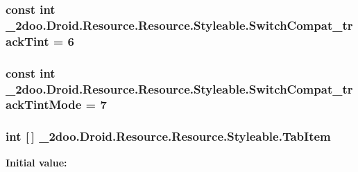 \hypertarget{class__2doo_1_1_droid_1_1_resource_1_1_styleable_d7f9b7bb738543049cc78874ad9e1a14}{
\subsubsection[{SwitchCompat\_\-trackTint}]{\setlength{\rightskip}{0pt plus 5cm}const int \_\-2doo.Droid.Resource.Resource.Styleable.SwitchCompat\_\-trackTint = 6}}
\label{class__2doo_1_1_droid_1_1_resource_1_1_styleable_d7f9b7bb738543049cc78874ad9e1a14}


\hypertarget{class__2doo_1_1_droid_1_1_resource_1_1_styleable_813e6aa02f3614c387dff846860c940b}{
\subsubsection[{SwitchCompat\_\-trackTintMode}]{\setlength{\rightskip}{0pt plus 5cm}const int \_\-2doo.Droid.Resource.Resource.Styleable.SwitchCompat\_\-trackTintMode = 7}}
\label{class__2doo_1_1_droid_1_1_resource_1_1_styleable_813e6aa02f3614c387dff846860c940b}


\hypertarget{class__2doo_1_1_droid_1_1_resource_1_1_styleable_fb90691204efbe55079c5d16006356cf}{
\subsubsection[{TabItem}]{\setlength{\rightskip}{0pt plus 5cm}int \mbox{[}$\,$\mbox{]} \_\-2doo.Droid.Resource.Resource.Styleable.TabItem}}
\label{class__2doo_1_1_droid_1_1_resource_1_1_styleable_fb90691204efbe55079c5d16006356cf}


\textbf{Initial value:}

